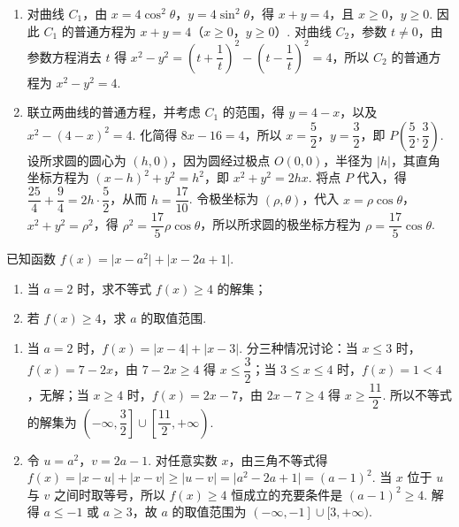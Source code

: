 \begin{solution}
\begin{enumerate}
\item 对曲线 \(C_1\)，由 \(x=4\cos^2\theta\)，\(y=4\sin^2\theta\)，得 \(x+y=4\)，且 \(x\geq0\)，\(y\geq0\). 因此 \(C_1\) 的普通方程为 \(x+y=4\)（\(x\geq0\)，\(y\geq0\)）. 对曲线 \(C_2\)，参数 \(t\ne0\)，由参数方程消去 \(t\) 得 \(x^2-y^2=\left(t+\dfrac1t\right)^2-\left(t-\dfrac1t\right)^2=4\)，所以 \(C_2\) 的普通方程为 \(x^2-y^2=4\).
\item 联立两曲线的普通方程，并考虑 \(C_1\) 的范围，得 \(y=4-x\)，以及 \(x^2-(4-x)^2=4\). 化简得 \(8x-16=4\)，所以 \(x=\dfrac{5}{2}\)，\(y=\dfrac{3}{2}\)，即 \(P\left(\dfrac{5}{2},\dfrac{3}{2}\right)\). 设所求圆的圆心为 \((h,0)\)，因为圆经过极点 \(O(0,0)\)，半径为 \(\lvert h\rvert\)，其直角坐标方程为 \((x-h)^2+y^2=h^2\)，即 \(x^2+y^2=2hx\). 将点 \(P\) 代入，得 \(\dfrac{25}{4}+\dfrac94=2h\cdot\dfrac52\)，从而 \(h=\dfrac{17}{10}\). 令极坐标为 \((\rho,\theta)\)，代入 \(x=\rho\cos\theta\)，\(x^2+y^2=\rho^2\)，得 \(\rho^2=\dfrac{17}{5}\rho\cos\theta\)，所以所求圆的极坐标方程为 \(\rho=\dfrac{17}{5}\cos\theta\).
\end{enumerate}
\end{solution}

\begin{problem}
已知函数 \(f(x)=\lvert x-a^2\rvert+\lvert x-2a+1\rvert\).

\begin{enumerate}
\item 当 \(a=2\) 时，求不等式 \(f(x)\ge 4\) 的解集；
\item 若 \(f(x)\ge 4\)，求 \(a\) 的取值范围.
\end{enumerate}
\end{problem}

\begin{solution}
\begin{enumerate}
\item 当 \(a=2\) 时，\(f(x)=\lvert x-4\rvert+\lvert x-3\rvert\). 分三种情况讨论：当 \(x\leq3\) 时，\(f(x)=7-2x\)，由 \(7-2x\geq4\) 得 \(x\leq\dfrac32\)；当 \(3\leq x\leq4\) 时，\(f(x)=1<4\)，无解；当 \(x\geq4\) 时，\(f(x)=2x-7\)，由 \(2x-7\geq4\) 得 \(x\geq\dfrac{11}{2}\). 所以不等式的解集为 \(\left(-\infty,\dfrac32\right]\cup\left[\dfrac{11}{2},+\infty\right)\).
\item 令 \(u=a^2\)，\(v=2a-1\). 对任意实数 \(x\)，由三角不等式得 \(f(x)=\lvert x-u\rvert+\lvert x-v\rvert\geq\lvert u-v\rvert=\lvert a^2-2a+1\rvert=(a-1)^2\). 当 \(x\) 位于 \(u\) 与 \(v\) 之间时取等号，所以 \(f(x)\geq4\) 恒成立的充要条件是 \((a-1)^2\geq4\). 解得 \(a\leq-1\) 或 \(a\geq3\)，故 \(a\) 的取值范围为 \(\left(-\infty,-1\right]\cup[3,+\infty)\).
\end{enumerate}
\end{solution}
